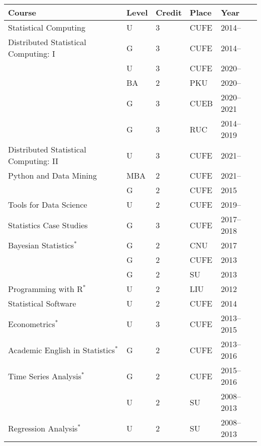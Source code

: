 \documentclass[twoside,a4paper]{article}
\begin{document}
\begin{center}
  \begin{tabular}{p{7.5cm}llll}
    \toprule
    Course                                  & Level & Credit  &Place         & Year       \\
    \midrule
    {Statistical Computing}                 & U     & 3  &CUFE          & 2014--     \\
    {Distributed Statistical Computing: I}  & G     & 3  &CUFE          & 2014--     \\
                                            & U     & 3  &CUFE          & 2020--     \\
                                            & BA     & 2  &PKU           & 2020--     \\
                                            & G     & 3  &CUEB          & 2020--2021 \\
                                            & G     & 3  &RUC           & 2014--2019 \\
    {Distributed Statistical Computing: II} & U     & 3  &CUFE          & 2021--     \\
    {Python and Data Mining}   & MBA   & 2  &CUFE          & 2021--     \\
                                            & G     & 2  &CUFE          & 2015       \\
    {Tools for Data Science}                & U     & 2  &CUFE          & 2019--     \\
    {Statistics Case Studies}               & G     & 3  &CUFE          & 2017--2018 \\
    {Bayesian Statistics}$^*$               & G     & 2  &CNU           & 2017       \\
                                            & G     & 2  &CUFE          & 2013       \\
                                            & G     & 2  &SU            & 2013       \\
    {Programming with R}$^*$                & U     & 2  &LIU           & 2012       \\
    {Statistical Software}                  & U     & 2  &CUFE          & 2014       \\
    {Econometrics}$^*$                      & U     & 3  &CUFE          & 2013--2015 \\
    {Academic English in Statistics}$^*$    & G     & 2  &CUFE          & 2013--2016 \\
    {Time Series Analysis}$^*$             & G     & 2  &CUFE          & 2015--2016 \\
                                            & U     & 2  &SU            & 2008--2013 \\
    {Regression Analysis}$^*$               & U     & 2  &SU            & 2008--2013 \\
    \bottomrule
  \end{tabular}
\end{center}
\end{document}
